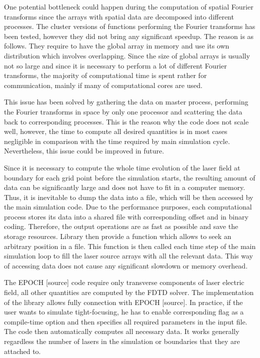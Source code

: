 One potential bottleneck could happen during the computation of spatial Fourier transforms since the arrays with spatial data are decomposed into different processes. The cluster versions of functions performing the Fourier transforms has been tested, however they did not bring any significant speedup. The reason is as follows. They require to have the global array in memory and use its own distribution which involves overlapping. Since the size of global arrays is usually not so large and since it is necessary to perform a lot of different Fourier transforms, the majority of computational time is spent rather for communication, mainly if many of computational cores are used.

This issue has been solved by gathering the data on master process, performing the Fourier transforms in space by only one processor and scattering the data back to corresponding processes. This is the reason why the code does not scale well, however, the time to compute all desired quantities is in most cases negligible in comparison with the time required by main simulation cycle. Nevertheless, this issue could be improved in future.

Since it is necessary to compute the whole time evolution of the laser field at boundary for each grid point before the simulation starts, the resulting amount of data can be significantly large and does not have to fit in a computer memory. Thus, it is inevitable to dump the data into a file, which will be then accessed by the main simulation code. Due to the performance purposes, each computational process stores its data into a shared file with corresponding offset and in binary coding. Therefore, the output operations are as fast as possible and save the storage resources. Library then provide a function which allows to seek an arbitrary position in a file. This function is then called each time step of the main simulation loop to fill the laser source arrays with all the relevant data. This way of accessing data does not cause any significant slowdown or memory overhead.

The EPOCH [source] code require only transverse components of laser electric field, all other quantities are computed by the FDTD solver. The implementation of the library allows fully connection with EPOCH [source]. In practice, if the user wants to simulate tight-focusing, he has to enable corresponding flag as a compile-time option and then specifies all required parameters in the input file. The code then automatically computes all necessary data. It works generally regardless the number of lasers in the simulation or boundaries that they are attached to.

